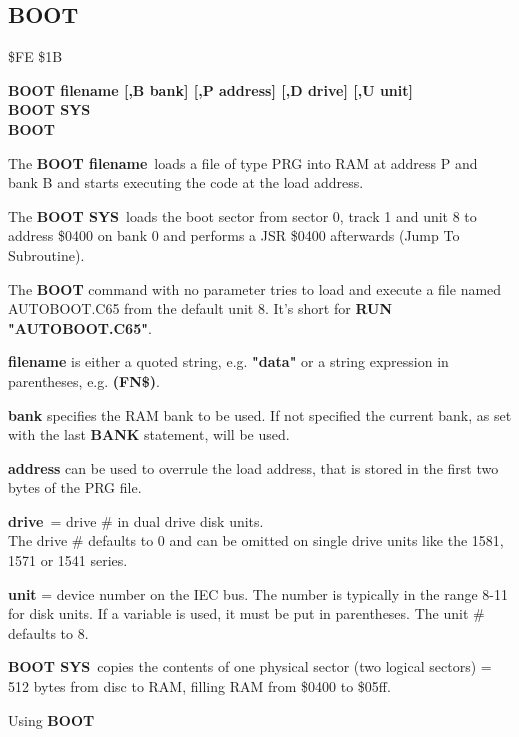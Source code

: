 \subsection{BOOT}
\begin{description}[leftmargin=3cm,style=nextline]
\item [Token:] \$FE \$1B
\item [Format:] {\bf BOOT filename [,B bank]
                [,P address]  [,D drive] [,U unit] } \\
                {\bf BOOT SYS} \\
                {\bf BOOT} 
\item [Usage:]
   The {\bf BOOT filename} loads a file of type
   PRG into RAM at address P and bank B and starts executing
   the code at the load address.

   The {\bf BOOT SYS} loads the boot sector from sector 0,
   track 1 and unit 8 to address \$0400 on bank 0 and
   performs a JSR \$0400 afterwards (Jump To Subroutine).

   The {\bf BOOT} command with no parameter tries to load
   and execute a file named AUTOBOOT.C65 from the default unit 8.
   It's short for {\bf RUN "AUTOBOOT.C65"}.

   {\bf filename} is either a quoted string, e.g. {\bf "data"} or
   a string expression in parentheses, e.g. {\bf (FN\$)}.

   {\bf bank} specifies the RAM bank to be used.
   If not specified the current bank, as set with the last
   {\bf BANK} statement, will be used.

   {\bf address} can be used to overrule the load address,
   that is stored in the first two bytes of the PRG file.

   {\bf drive} = drive \# in dual drive disk units. \\
   The drive \# defaults to 0 and can be omitted on single drive units
   like the 1581, 1571 or 1541 series.

   {\bf unit} = device number on the IEC bus.
   The number is typically in the range 8-11 for disk units.
   If a variable is used, it must be put in parentheses.
   The unit \# defaults to 8.

\item [Remarks:]
   {\bf BOOT SYS} copies the contents of one physical sector
   (two logical sectors) = 512 bytes from disc to RAM,
   filling RAM from \$0400 to \$05ff.

\item [Example:] Using {\bf BOOT}
\end{description}

